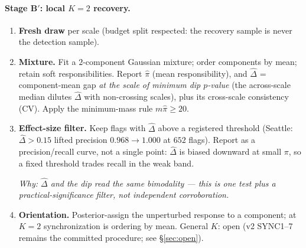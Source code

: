 \documentclass[11pt]{article}
\newcommand{\why}[1]{\par\noindent\textcolor{muted}{\small\itshape Why: #1}}
\begin{document}
\paragraph{Stage B$'$: local $K{=}2$ recovery.}
\begin{enumerate}[label=\textbf{B\arabic*.},leftmargin=2.7em,itemsep=2pt]
  \item \textbf{Fresh draw} per scale (budget split respected: the recovery sample is never
  the detection sample).
  \item \textbf{Mixture.} Fit a $2$-component Gaussian mixture; order components by mean;
  retain soft responsibilities. Report $\widehat\pi$ (mean responsibility), and
  $\widehat\Delta$ = component-mean gap \emph{at the scale of minimum dip $p$-value} (the
  across-scale median dilutes $\widehat\Delta$ with non-crossing scales), plus its
  cross-scale consistency (CV). Apply the minimum-mass rule $m\widehat\pi\ge 20$.
  \item \textbf{Effect-size filter.} Keep flags with $\widehat\Delta$ above a registered
  threshold (Seattle: $\widehat\Delta>0.15$ lifted precision $0.968\to 1.000$ at $652$
  flags). Report as a precision/recall curve, not a single point: $\widehat\Delta$ is biased
  downward at small $\pi$, so a fixed threshold trades recall in the weak band.
  \why{$\widehat\Delta$ and the dip read the same bimodality --- this is one test plus a
  practical-significance filter, not independent corroboration.}
  \item \textbf{Orientation.} Posterior-assign the unperturbed response to a component;
  at $K{=}2$ synchronization is ordering by mean. General $K$: open
  (v2 SYNC1--7 remains the committed procedure; see \S\ref{sec:open}).
\end{enumerate}
\end{document}
